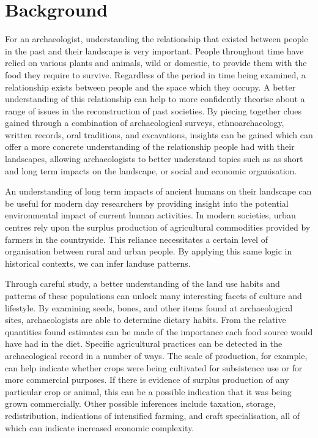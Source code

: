 \section{Background} 

For an archaeologist, understanding the relationship that existed between
people in the past and their landscape is very important.  People throughout
time have relied on various plants and animals, wild or domestic, to provide
them with the food they require to survive.  Regardless of the period in time
being examined, a relationship exists between people and the space which they
occupy.  A better understanding of this relationship can help to more
confidently theorise about a range of issues in the reconstruction of past
societies.  By piecing together clues gained through a combination of
archaeological surveys, ethnoarchaeology, written records, oral traditions, and
excavations, insights can be gained which can offer a more concrete
understanding of the relationship people had with their landscapes, allowing
archaeologists to better understand topics such as as short and long term
impacts on the landscape, or social and economic organisation. 

An understanding
of long term impacts of ancient humans on their landscape can be useful for
modern day researchers by providing insight into the potential environmental
impact of current human activities. In modern societies, urban centres rely upon
the surplus production of agricultural commodities provided by farmers in the
countryside.  This reliance necessitates a certain level of organisation between
rural and urban people.  By applying this same logic in historical contexts, we
can infer landuse patterns.

Through careful study, a better understanding of the land use habits and
patterns of these
populations can unlock many interesting facets of culture and lifestyle.
By examining seeds, bones, and other items found at archaeological sites,
archaeologists are able to determine dietary habits. From the relative
quantities found estimates can be made of the importance each food source would
have had in the diet.  Specific agricultural practices can be detected in the
archaeological record in a number of ways.  The scale of production, for
example, can help indicate whether crops were being cultivated for subsistence
use or for more commercial
purposes.  If there is evidence of surplus production of any particular
crop or animal, this can be a possible indication that it was being grown
commercially.  Other possible inferences include taxation, storage,
redistribution, indications of intensified farming, and craft specialisation,
all of which can indicate increased economic complexity.

